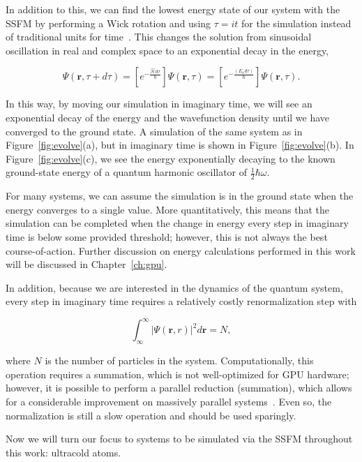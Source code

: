 In addition to this, we can find the lowest energy state of our system with the SSFM by performing a Wick rotation and using $\tau = it$ for the simulation instead of traditional units for time~\cite{wick1954}.
This changes the solution from sinusoidal oscillation in real and complex space to an exponential decay in the energy,

$$
\Psi(\mathbf{r},\tau + d\tau) = \left[e^{-\frac{\mathcal{\hat{H}}d\tau}{\hbar}}\right]\Psi(\mathbf{r},\tau) = \left[e^{-\frac{(E_n d\tau)}{\hbar}}\right]\Psi(\mathbf{r},\tau).
$$

\noindent In this way, by moving our simulation in imaginary time, we will see an exponential decay of the energy and the wavefunction density until we have converged to the ground state.
A simulation of the same system as in Figure~\ref{fig:evolve}(a), but in imaginary time is shown in Figure~\ref{fig:evolve}(b).
In Figure~\ref{fig:evolve}(c), we see the energy exponentially decaying to the known ground-state energy of a quantum harmonic oscillator of $\frac{1}{2}\hbar\omega$.

For many systems, we can assume the simulation is in the ground state when the energy converges to a single value.
More quantitatively, this means that the simulation can be completed when the change in energy every step in imaginary time is below some provided threshold; however, this is not always the best course-of-action.
Further discussion on energy calculations performed in this work will be discussed in Chapter~\ref{ch:gpu}.

In addition, because we are interested in the dynamics of the quantum system, every step in imaginary time requires a relatively costly renormalization step with

\begin{equation}
    \label{eqn:norm}
    \int_\infty^\infty |\Psi(\mathbf{r},r)|^2 d\mathbf{r} = N,
\end{equation}

\noindent where $N$ is the number of particles in the system.
Computationally, this operation requires a summation, which is not well-optimized for GPU hardware; however, it is possible to perform a parallel reduction (summation), which allows for a considerable improvement on massively parallel systems~\cite{harris2007}.
Even so, the normalization is still a slow operation and should be used sparingly.

Now we will turn our focus to systems to be simulated via the SSFM throughout this work: ultracold atoms.

